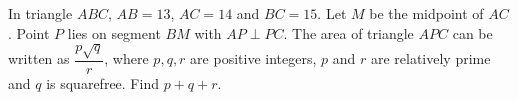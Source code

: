 In triangle $ABC$, $AB=13$, $AC=14$ and $BC=15$. Let $M$ be the midpoint of $AC$. Point $P$ lies on segment $BM$ with $AP\perp PC$. The area of triangle $APC$ can be written as $\dfrac{p\sqrt q}{r}$, where $p,q,r$ are positive integers, $p$ and $r$ are relatively prime and $q$ is squarefree. Find $p+q+r$.
